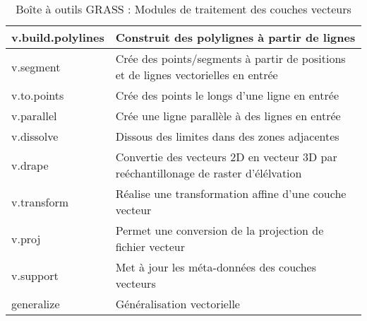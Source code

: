 \begin{table}[H]
\begin{tabular}{|p{3cm}|p{11cm}|}
  \hline v.build.polylines & Construit des polylignes à partir de lignes\\
  \hline v.segment & Crée des points/segments à partir de positions et de lignes vectorielles en entrée\\
  \hline v.to.points & Crée des points le longs d'une ligne en entrée\\
  \hline v.parallel & Crée une ligne parallèle à des lignes en entrée\\
  \hline v.dissolve & Dissous des limites dans des zones adjacentes\\
  \hline v.drape & Convertie des vecteurs 2D en vecteur 3D par reéchantillonage de raster d'élélvation\\
  \hline v.transform & Réalise une transformation affine d'une couche vecteur\\
  \hline v.proj & Permet une conversion de la projection de fichier vecteur\\
  \hline v.support & Met à jour les méta-données des couches vecteurs\\
  \hline generalize & Généralisation vectorielle\\
\hline
\end{tabular}
\caption{Boîte à outils GRASS : Modules de traitement des couches vecteurs}
\end{table}

